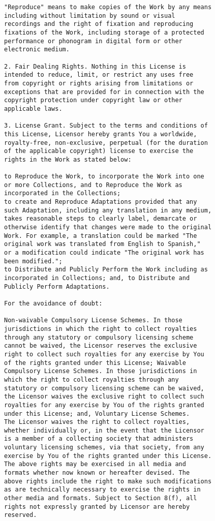 \begin{verbatim}
"Reproduce" means to make copies of the Work by any means
including without limitation by sound or visual
recordings and the right of fixation and reproducing
fixations of the Work, including storage of a protected
performance or phonogram in digital form or other
electronic medium.

2. Fair Dealing Rights. Nothing in this License is
intended to reduce, limit, or restrict any uses free
from copyright or rights arising from limitations or
exceptions that are provided for in connection with the
copyright protection under copyright law or other
applicable laws.

3. License Grant. Subject to the terms and conditions of
this License, Licensor hereby grants You a worldwide,
royalty-free, non-exclusive, perpetual (for the duration
of the applicable copyright) license to exercise the
rights in the Work as stated below:

to Reproduce the Work, to incorporate the Work into one
or more Collections, and to Reproduce the Work as
incorporated in the Collections;
to create and Reproduce Adaptations provided that any
such Adaptation, including any translation in any medium,
takes reasonable steps to clearly label, demarcate or
otherwise identify that changes were made to the original
Work. For example, a translation could be marked "The
original work was translated from English to Spanish,"
or a modification could indicate "The original work has
been modified.";
to Distribute and Publicly Perform the Work including as
incorporated in Collections; and, to Distribute and
Publicly Perform Adaptations.

For the avoidance of doubt:

Non-waivable Compulsory License Schemes. In those
jurisdictions in which the right to collect royalties
through any statutory or compulsory licensing scheme
cannot be waived, the Licensor reserves the exclusive
right to collect such royalties for any exercise by You
of the rights granted under this License; Waivable
Compulsory License Schemes. In those jurisdictions in
which the right to collect royalties through any
statutory or compulsory licensing scheme can be waived,
the Licensor waives the exclusive right to collect such
royalties for any exercise by You of the rights granted
under this License; and, Voluntary License Schemes.
The Licensor waives the right to collect royalties,
whether individually or, in the event that the Licensor
is a member of a collecting society that administers
voluntary licensing schemes, via that society, from any
exercise by You of the rights granted under this License.
The above rights may be exercised in all media and
formats whether now known or hereafter devised. The
above rights include the right to make such modifications
as are technically necessary to exercise the rights in
other media and formats. Subject to Section 8(f), all
rights not expressly granted by Licensor are hereby
reserved.


\end{verbatim}
